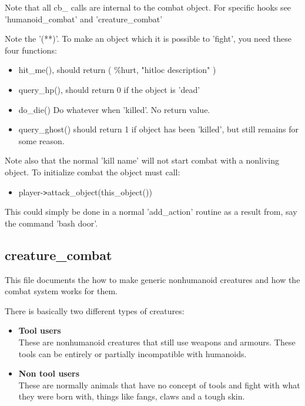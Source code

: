 Note that all cb\_ calls are internal to the combat object.
For specific hooks see 'humanoid\_combat' and  'creature\_combat'

Note the '(**)'. To make an object which it is possible to 'fight', you need
these four functions: 

\begin{itemize}
\item hit\_me(), should return ({  \%hurt, "hitloc description" })
\item query\_hp(), should return 0 if the object is 'dead'
\item do\_die() Do whatever when 'killed'. No return value.
\item query\_ghost() should return 1 if object has been 'killed', but still
      remains for some reason.
\end{itemize}

Note also that the normal 'kill name' will not start combat with a nonliving
object. To initialize combat the object must call:

\begin{itemize} 
\item player-\verb+>+attack\_object(this\_object())
\end{itemize}

This could simply be done in a normal 'add\_action' routine as a result from,
say the command 'bash door'. 


\subsection{creature\_combat}

This file documents the how to make generic nonhumanoid creatures and how the
combat system works for them.

There is basically two different types of creatures:

\begin{itemize}
\item{\bf Tool users} \\
        These are nonhumanoid creatures that still use weapons
        and armours. These tools can be entirely or partially
        incompatible with humanoids. 
    
\item{\bf Non tool users} \\
        These are normally animals that have no concept of tools
        and fight with what they were born with, things like
        fangs, claws and a tough skin.
\end{itemize}

